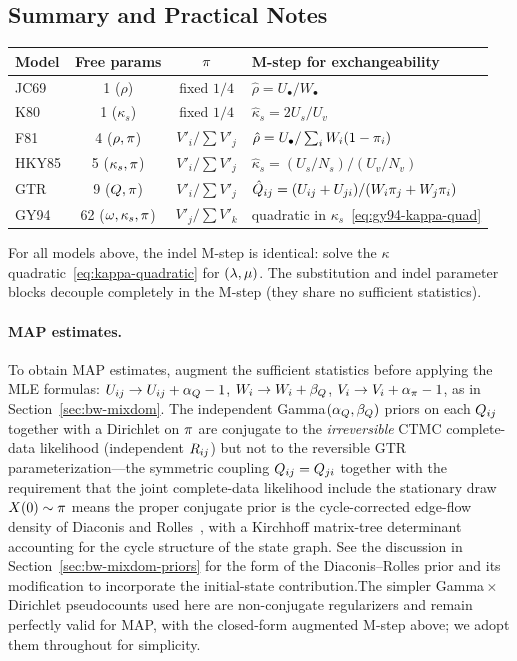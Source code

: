 \subsection{Summary and Practical Notes}
\label{sec:subst-mstep-summary}

\begin{center}
\begin{tabular}{lccl}
\toprule
Model & Free params & $\pi$ & M-step for exchangeability \\
\midrule
JC69 & 1 ($\rho$) & fixed $1/4$ & $\hat\rho = U_\bullet/W_\bullet$ \\
K80 & 1 ($\kappa_s$) & fixed $1/4$ & $\hat\kappa_s = 2U_s/U_v$ \\
F81 & 4 ($\rho, \pi$) & $V'_i/\sum V'_j$ & $\hat\rho = U_\bullet / \sum_i W_i(1-\pi_i)$ \\
HKY85 & 5 ($\kappa_s, \pi$) & $V'_i/\sum V'_j$ & $\hat\kappa_s = (U_s/N_s)/(U_v/N_v)$ \\
GTR & 9 ($Q, \pi$) & $V'_i/\sum V'_j$ & $\hat{Q}_{ij} = (U_{ij}+U_{ji})/(W_i\pi_j+W_j\pi_i)$ \\
GY94 & 62 ($\omega,\kappa_s,\pi$) & $V'_j/\sum V'_k$ & quadratic in $\kappa_s$~\eqref{eq:gy94-kappa-quad} \\
\bottomrule
\end{tabular}
\end{center}

For all models above, the indel M-step is identical: solve
the $\kappa$ quadratic~\eqref{eq:kappa-quadratic} for
$(\lambda, \mu)$.
The substitution and indel parameter blocks decouple
completely in the M-step (they share no sufficient statistics).

\paragraph{MAP estimates.}
To obtain MAP estimates,
augment the sufficient statistics before applying the MLE formulas:
$U_{ij} \to U_{ij} + \alpha_Q - 1$,
$W_i \to W_i + \beta_Q$,
$V_i \to V_i + \alpha_\pi - 1$\ifdefined\MIXDOMPAPER ,
as in Section~\ref{sec:bw-mixdom}\fi.
The independent Gamma$(\alpha_Q,\beta_Q)$ priors on each
$Q_{ij}$ together with a Dirichlet on $\pi$ are conjugate to the
\emph{irreversible} CTMC complete-data likelihood (independent
$R_{ij}$) but not to the reversible GTR
parameterization---the symmetric coupling $Q_{ij} = Q_{ji}$
together with the requirement that the joint complete-data likelihood
include the stationary draw $X(0) \sim \pi$ means the proper
conjugate prior is the cycle-corrected edge-flow density of
Diaconis and Rolles~\cite{DiaconisRolles2006}, with a Kirchhoff
matrix-tree determinant accounting for the cycle structure of the
state graph.\ifdefined\MIXDOMPAPER{}  See the discussion in Section~\ref{sec:bw-mixdom-priors}
for the form of the Diaconis--Rolles prior and its modification to
incorporate the initial-state contribution.\fi  The simpler
Gamma${}\times{}$Dirichlet pseudocounts used here are non-conjugate
regularizers and remain perfectly valid for MAP, with the closed-form
augmented M-step above; we adopt them throughout for simplicity.

